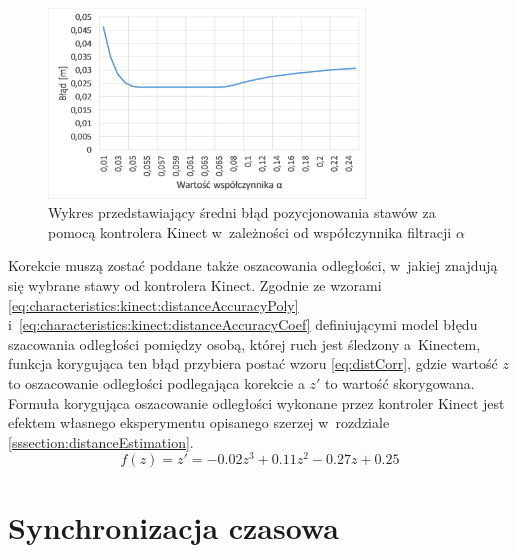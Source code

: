 \begin{figure}[!htb]
	\centering 
	\includegraphics[width=0.75\textwidth]{images/kinectPosErrorAlpha.png}
	\caption{Wykres przedstawiający średni błąd pozycjonowania stawów za pomocą kontrolera Kinect w~zależności od współczynnika filtracji $\alpha$}
	\label{fig:hybrid:kinect:lpf}
\end{figure}

Korekcie muszą zostać poddane także oszacowania odległości, w~jakiej znajdują się wybrane stawy od kontrolera Kinect. Zgodnie ze wzorami \eqref{eq:characteristics:kinect:distanceAccuracyPoly} i~\eqref{eq:characteristics:kinect:distanceAccuracyCoef} definiującymi model błędu szacowania odległości pomiędzy osobą, której ruch jest śledzony a~Kinectem, funkcja korygująca ten błąd przybiera postać wzoru \eqref{eq:distCorr}, gdzie wartość $z$ to oszacowanie odległości podlegająca korekcie 
a $z'$ to wartość skorygowana. Formuła korygująca oszacowanie odległości wykonane przez kontroler Kinect jest efektem własnego eksperymentu opisanego szerzej w~rozdziale \ref{sssection:distanceEstimation}.
\begin{equation}
	f(z) = z' = -0.02z^3 + 0.11z^2 - 0.27z + 0.25
	\label{eq:distCorr}
\end{equation}
 

\section{Synchronizacja czasowa}

